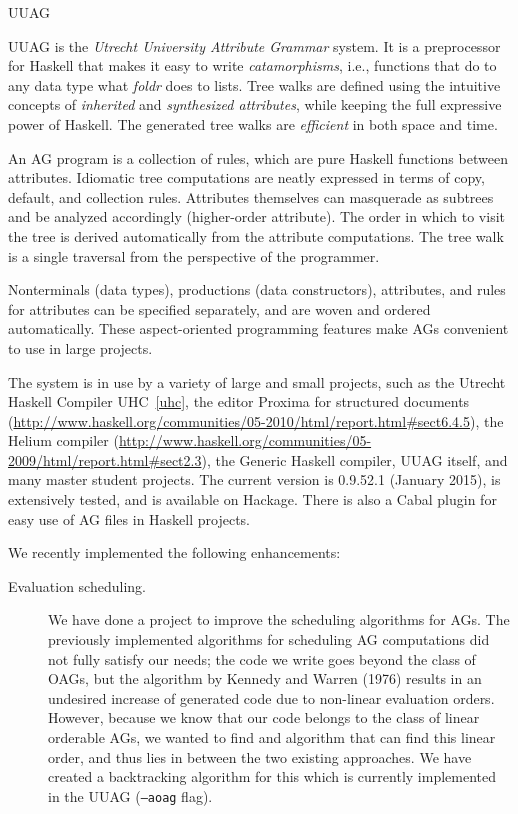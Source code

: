 \begin{hcarentry}[updated]{UUAG}
\label{uuag}
\makeheader

UUAG is the \emph{Utrecht University Attribute Grammar} system. It is a preprocessor for Haskell
that makes it easy to write \emph{catamorphisms}, i.e., functions that do to any data type what
\emph{foldr} does to lists. Tree walks are defined using the intuitive concepts of
\emph{inherited} and \emph{synthesized attributes}, while keeping the full expressive power
of Haskell. The generated tree walks are \emph{efficient} in both space and time.

An AG program is a collection of rules, which are pure Haskell functions between attributes.
Idiomatic tree computations are neatly expressed in terms of copy, default, and collection rules.
Attributes themselves can masquerade as subtrees and be analyzed accordingly (higher-order attribute).
The order in which to visit the tree is derived automatically from the attribute computations.
The tree walk is a single traversal from the perspective of the programmer.

Nonterminals (data types), productions (data constructors), attributes, and rules for attributes can
be specified separately, and are woven and ordered automatically. These aspect-oriented programming
features make AGs convenient to use in large projects.

The system is in use by a variety of large and small projects, such as the Utrecht Haskell Compiler
UHC~\cref{uhc}, the editor Proxima for structured documents (\url{http://www.haskell.org/communities/05-2010/html/report.html#sect6.4.5}),
the Helium compiler (\url{http://www.haskell.org/communities/05-2009/html/report.html#sect2.3}),
the Generic Haskell compiler, UUAG itself, and many master student projects.
The current version is 0.9.52.1 (January 2015), is extensively tested, and is available on Hackage.
There is also a Cabal plugin for easy use of AG files in Haskell projects.

We recently implemented the following enhancements:
\begin{description}
\item[Evaluation scheduling.]
  We have done a project to improve the scheduling algorithms for AGs. The previously implemented
  algorithms for scheduling AG computations did not fully satisfy our needs; the code we write goes
  beyond the class of OAGs, but the algorithm by Kennedy and Warren (1976) results in an undesired
  increase of generated code due to non-linear evaluation orders. However, because we know that our
  code belongs to the class of linear orderable AGs, we wanted to find and algorithm that can find
  this linear order, and thus lies in between the two existing approaches. We have created a backtracking
  algorithm for this which is currently implemented in the UUAG (\texttt{--aoag} flag).
  

\end{description}
\end{hcarentry}
